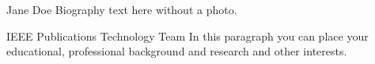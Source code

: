 \begin{IEEEbiographynophoto}{Jane Doe}
    Biography text here without a photo.
\end{IEEEbiographynophoto}

\begin{IEEEbiography}[
    ]{IEEE Publications Technology Team}
    In this paragraph you can place your educational, professional background and research and other interests.\end{IEEEbiography}